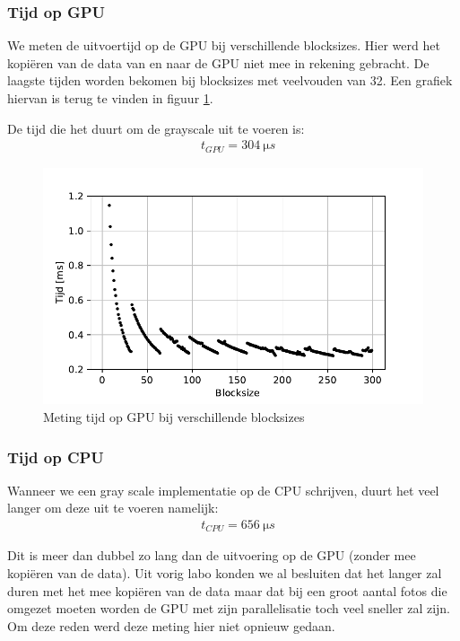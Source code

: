\documentclass[11pt,twoside,a4paper]{article}
\begin{document}
\subsubsection{Tijd op GPU}

We meten de uitvoertijd op de GPU bij verschillende blocksizes. Hier werd het kopi\"eren van de data van en naar de GPU niet mee in rekening gebracht. De laagste tijden worden bekomen bij blocksizes met veelvouden van 32. Een grafiek hiervan is terug te vinden in figuur \ref{fig:meting_grayscale_gpu}.

De tijd die het duurt om de grayscale uit te voeren is:
\begin{align*}
    &t_{GPU} = \SI{304}{\micro s}
\end{align*}


\begin{figure}[h!]
    \centering
    \includegraphics[]{gpu_grayscale.pdf}
    \caption{Meting tijd op GPU bij verschillende blocksizes}
    \label{fig:meting_grayscale_gpu}
\end{figure}


\subsubsection{Tijd op CPU}

Wanneer we een gray scale implementatie op de CPU schrijven, duurt het veel langer om deze uit te voeren namelijk:
\begin{align*}
    &t_{CPU} = \SI{656}{\micro s}
\end{align*}

Dit is meer dan dubbel zo lang dan de uitvoering op de GPU (zonder mee kopi\"eren van de data). Uit vorig labo konden we al besluiten dat het langer zal duren met het mee kopi\"eren van de data maar dat bij een groot aantal fotos die omgezet moeten worden de GPU met zijn parallelisatie toch veel sneller zal zijn. Om deze reden werd deze meting hier niet opnieuw gedaan.
\end{document}
